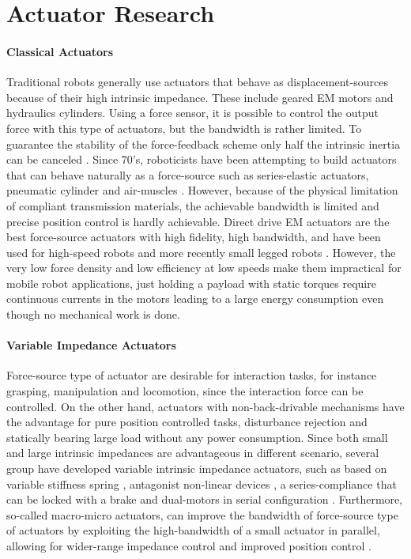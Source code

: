 \section{Actuator Research}
\label{sec:actres}

\paragraph{Classical Actuators} Traditional robots generally use actuators that behave as displacement-sources because of their high intrinsic impedance. These include geared EM motors and hydraulics cylinders. Using a force sensor, it is possible to control the output force with this type of actuators, but the bandwidth is rather limited. To guarantee the stability of the force-feedback scheme only half the intrinsic inertia can be canceled \cite{hogan_impedance_2004}. Since 70's, roboticists have been attempting to build actuators that can behave naturally as a force-source such as series-elastic actuators, pneumatic cylinder and air-muscles \cite{hanafusa_stable_1977}\cite{pratt_series_1995}. However, because of the physical limitation of compliant transmission materials, the achievable bandwidth is limited and precise position control is hardly achievable. Direct drive EM actuators are the best force-source actuators with high fidelity, high bandwidth, and have been used for high-speed robots \cite{asada_direct-drive_1987} and more recently small legged robots \cite{kenneally_design_2016}. However, the very low force density \cite{hollerbach_comparative_1992} and low efficiency at low speeds make them impractical for mobile robot applications, just holding a payload with static torques require continuous currents in the motors leading to a large energy consumption even though no mechanical work is done. 

\paragraph{Variable Impedance Actuators} Force-source type of actuator are desirable for interaction tasks, for instance grasping, manipulation and locomotion, since the interaction force can be controlled. On the other hand, actuators with non-back-drivable mechanisms have the advantage for pure position controlled tasks, disturbance rejection and statically bearing large load without any power consumption. Since both small and large intrinsic impedances are advantageous in different scenario, several group have developed variable intrinsic impedance actuators, such as based on variable stiffness spring \cite{tonietti_design_2005}, antagonist non-linear devices \cite{koganezawa_antagonistic_2006}, a series-compliance that can be locked with a brake \cite{leach_linear_2012} and dual-motors in serial configuration \cite{kim_serial-type_2010}. Furthermore, so-called macro-micro actuators, can improve the bandwidth of force-source type of actuators by exploiting the high-bandwidth of a small actuator in parallel, allowing for wider-range impedance control and improved position control \cite{morrell_parallel-coupled_1998}.

